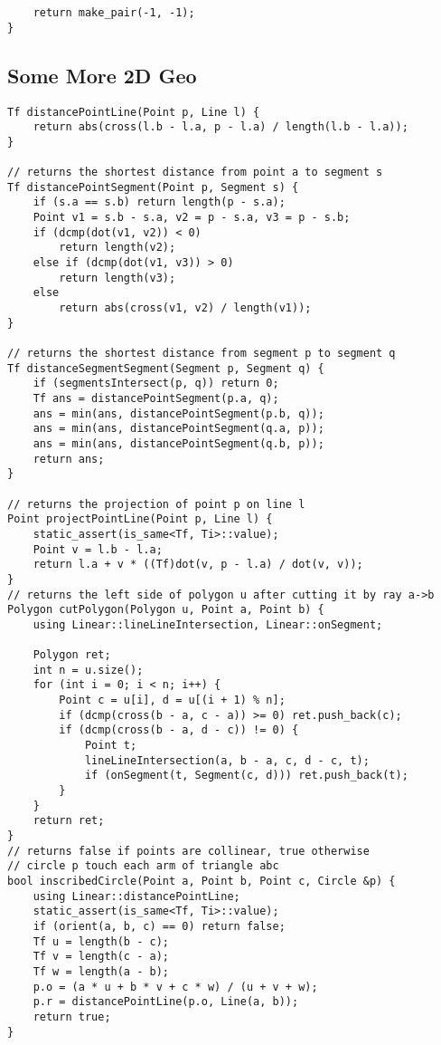 \documentclass[10pt,a4paper,onesided]{article}
\begin{document}
\begin{multicols*}{3}
\begin{lstlisting}
    return make_pair(-1, -1);
}
\end{lstlisting}
\subsection{Some More 2D Geo}
\begin{lstlisting}
Tf distancePointLine(Point p, Line l) {
    return abs(cross(l.b - l.a, p - l.a) / length(l.b - l.a));
}

// returns the shortest distance from point a to segment s
Tf distancePointSegment(Point p, Segment s) {
    if (s.a == s.b) return length(p - s.a);
    Point v1 = s.b - s.a, v2 = p - s.a, v3 = p - s.b;
    if (dcmp(dot(v1, v2)) < 0)
        return length(v2);
    else if (dcmp(dot(v1, v3)) > 0)
        return length(v3);
    else
        return abs(cross(v1, v2) / length(v1));
}

// returns the shortest distance from segment p to segment q
Tf distanceSegmentSegment(Segment p, Segment q) {
    if (segmentsIntersect(p, q)) return 0;
    Tf ans = distancePointSegment(p.a, q);
    ans = min(ans, distancePointSegment(p.b, q));
    ans = min(ans, distancePointSegment(q.a, p));
    ans = min(ans, distancePointSegment(q.b, p));
    return ans;
}

// returns the projection of point p on line l
Point projectPointLine(Point p, Line l) {
    static_assert(is_same<Tf, Ti>::value);
    Point v = l.b - l.a;
    return l.a + v * ((Tf)dot(v, p - l.a) / dot(v, v));
}
// returns the left side of polygon u after cutting it by ray a->b
Polygon cutPolygon(Polygon u, Point a, Point b) {
    using Linear::lineLineIntersection, Linear::onSegment;

    Polygon ret;
    int n = u.size();
    for (int i = 0; i < n; i++) {
        Point c = u[i], d = u[(i + 1) % n];
        if (dcmp(cross(b - a, c - a)) >= 0) ret.push_back(c);
        if (dcmp(cross(b - a, d - c)) != 0) {
            Point t;
            lineLineIntersection(a, b - a, c, d - c, t);
            if (onSegment(t, Segment(c, d))) ret.push_back(t);
        }
    }
    return ret;
}
// returns false if points are collinear, true otherwise
// circle p touch each arm of triangle abc
bool inscribedCircle(Point a, Point b, Point c, Circle &p) {
    using Linear::distancePointLine;
    static_assert(is_same<Tf, Ti>::value);
    if (orient(a, b, c) == 0) return false;
    Tf u = length(b - c);
    Tf v = length(c - a);
    Tf w = length(a - b);
    p.o = (a * u + b * v + c * w) / (u + v + w);
    p.r = distancePointLine(p.o, Line(a, b));
    return true;
}


\end{lstlisting}
\end{multicols*}
\end{document}
